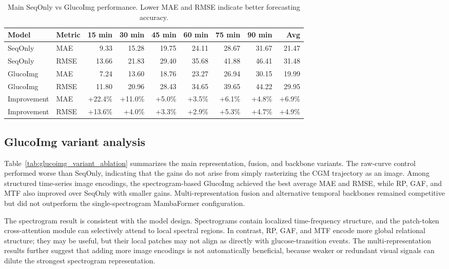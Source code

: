 \documentclass[11pt]{article}
\begin{document}
\begin{table}[t]
\centering
\caption{Main SeqOnly vs GlucoImg performance. Lower MAE and RMSE indicate better forecasting accuracy.}
\label{tab:main}
\small
\setlength{\tabcolsep}{4pt}
\begin{tabular}{llrrrrrrr}
\toprule
Model & Metric & 15 min & 30 min & 45 min & 60 min & 75 min & 90 min & Avg \\
\midrule
SeqOnly & MAE & 9.33 & 15.28 & 19.75 & 24.11 & 28.67 & 31.67 & 21.47 \\
SeqOnly & RMSE & 13.66 & 21.83 & 29.40 & 35.68 & 41.88 & 46.41 & 31.48 \\
GlucoImg & MAE & 7.24 & 13.60 & 18.76 & 23.27 & 26.94 & 30.15 & 19.99 \\
GlucoImg & RMSE & 11.80 & 20.96 & 28.43 & 34.65 & 39.65 & 44.22 & 29.95 \\
Improvement & MAE & +22.4\% & +11.0\% & +5.0\% & +3.5\% & +6.1\% & +4.8\% & +6.9\% \\
Improvement & RMSE & +13.6\% & +4.0\% & +3.3\% & +2.9\% & +5.3\% & +4.7\% & +4.9\% \\
\bottomrule
\end{tabular}
\end{table}

\subsection{GlucoImg variant analysis}

Table~\ref{tab:glucoimg_variant_ablation} summarizes the main representation, fusion, and backbone variants. The raw-curve control performed worse than SeqOnly, indicating that the gains do not arise from simply rasterizing the CGM trajectory as an image. Among structured time-series image encodings, the spectrogram-based GlucoImg achieved the best average MAE and RMSE, while RP, GAF, and MTF also improved over SeqOnly with smaller gains. Multi-representation fusion and alternative temporal backbones remained competitive but did not outperform the single-spectrogram MambaFormer configuration.



The spectrogram result is consistent with the model design. Spectrograms contain localized time-frequency structure, and the patch-token cross-attention module can selectively attend to local spectral regions. In contrast, RP, GAF, and MTF encode more global relational structure; they may be useful, but their local patches may not align as directly with glucose-transition events. The multi-representation results further suggest that adding more image encodings is not automatically beneficial, because weaker or redundant visual signals can dilute the strongest spectrogram representation.
\end{document}
